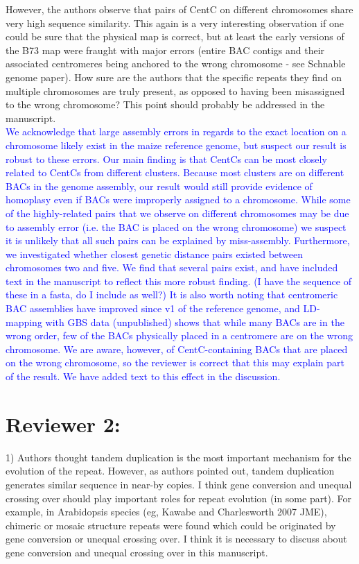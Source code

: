\documentclass[]{article}
\newcommand{\res}[1]{\noindent \textcolor{blue}{{#1}} \\}
\begin{document}
However, the authors observe that pairs of  CentC on different chromosomes share very high sequence similarity.  This again is a very interesting observation if one could be sure that the physical map is correct, but at least the early versions of the B73 map were fraught with major errors (entire BAC contigs and their associated centromeres being anchored to the wrong chromosome - see Schnable genome paper).  How sure are the authors that the specific repeats they find on multiple chromosomes are truly present, as opposed to having been misassigned to the wrong chromosome? This point should probably be addressed in the manuscript.\\

\res{We acknowledge that large assembly errors in regards to the exact location on a chromosome likely exist in the maize reference genome, but suspect our result is robust to these errors.
Our main finding is that CentCs can be most closely related to CentCs from different clusters.
Because most clusters are on different BACs in the genome assembly, our result would still provide evidence of homoplasy even if BACs were improperly assigned to a chromosome. 
While some of the highly-related pairs that we observe on different chromosomes may be due to assembly error (i.e. the BAC is placed on the wrong chromosome) we suspect it is unlikely that all such pairs can be explained by miss-assembly.  
Furthermore, we investigated whether closest genetic distance pairs existed between chromosomes two and five.
We find that several pairs exist, and have included text in the manuscript to reflect this more robust finding. (I have the sequence of these in a fasta, do I include as well?)
It is also worth noting that centromeric BAC assemblies have improved since v1 of the reference genome, and LD-mapping with GBS data (unpublished) shows that while many BACs are in the wrong order, few of the BACs physically placed in a centromere are on the wrong chromosome. 
We are aware, however, of CentC-containing BACs that are placed on the wrong chromosome, so the reviewer is correct that this may explain part of the result.  
We have added text to this effect in the discussion.}

\section*{Reviewer 2:}

1) Authors thought tandem duplication is the most important mechanism for the evolution of the repeat. However, as authors pointed out, tandem duplication generates similar sequence in near-by copies. I think gene conversion and unequal crossing over should play important roles for repeat evolution (in some part). For example, in Arabidopsis species (eg, Kawabe and Charlesworth 2007 JME), chimeric or mosaic structure repeats were found which could be originated by gene conversion or unequal crossing over. I think it is necessary to discuss about gene conversion and unequal crossing over in this manuscript.\\
\end{document}
